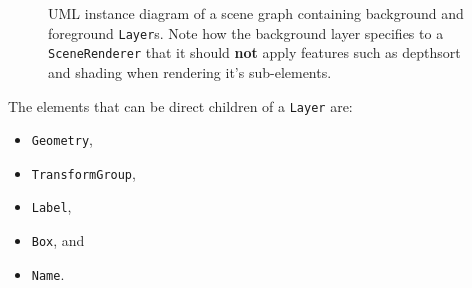 \documentclass[10pt,aps, prb,preprint]{article}
\begin{document}
\begin{figure}[!h]
\label{fig:layerScene}
\begin{center}
\caption{UML instance diagram of a scene graph containing background and foreground \texttt{Layer}s. Note how the background layer specifies to a \texttt{SceneRenderer} that it should \textbf{not} apply features such as depthsort and shading when rendering it's sub-elements.}
\end{center}
\end{figure}

The elements that can be direct children of a \texttt{Layer} are:
\begin{itemize}
\item \texttt{Geometry},
\item \texttt{TransformGroup},
\item \texttt{Label},
\item \texttt{Box}, and
\item \texttt{Name}.
\end{itemize}


\end{document}
